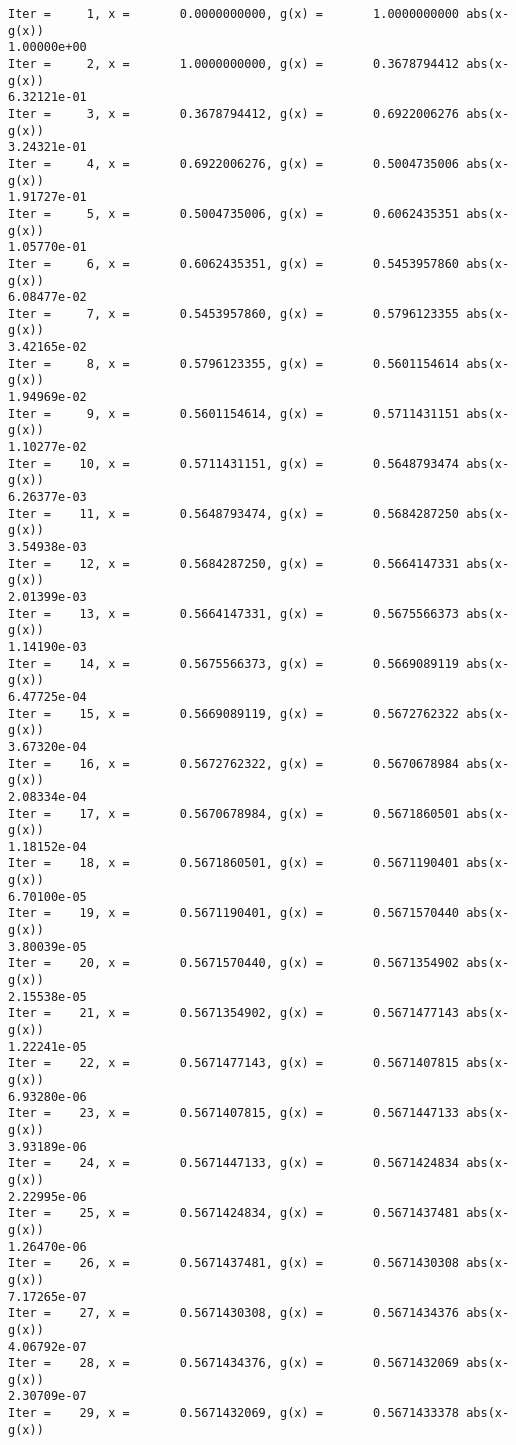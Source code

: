 \documentclass[11pt]{article}
\begin{document}
    \begin{Verbatim}[commandchars=\\\{\}]
Iter =     1, x =       0.0000000000, g(x) =       1.0000000000 abs(x-g(x))
1.00000e+00
Iter =     2, x =       1.0000000000, g(x) =       0.3678794412 abs(x-g(x))
6.32121e-01
Iter =     3, x =       0.3678794412, g(x) =       0.6922006276 abs(x-g(x))
3.24321e-01
Iter =     4, x =       0.6922006276, g(x) =       0.5004735006 abs(x-g(x))
1.91727e-01
Iter =     5, x =       0.5004735006, g(x) =       0.6062435351 abs(x-g(x))
1.05770e-01
Iter =     6, x =       0.6062435351, g(x) =       0.5453957860 abs(x-g(x))
6.08477e-02
Iter =     7, x =       0.5453957860, g(x) =       0.5796123355 abs(x-g(x))
3.42165e-02
Iter =     8, x =       0.5796123355, g(x) =       0.5601154614 abs(x-g(x))
1.94969e-02
Iter =     9, x =       0.5601154614, g(x) =       0.5711431151 abs(x-g(x))
1.10277e-02
Iter =    10, x =       0.5711431151, g(x) =       0.5648793474 abs(x-g(x))
6.26377e-03
Iter =    11, x =       0.5648793474, g(x) =       0.5684287250 abs(x-g(x))
3.54938e-03
Iter =    12, x =       0.5684287250, g(x) =       0.5664147331 abs(x-g(x))
2.01399e-03
Iter =    13, x =       0.5664147331, g(x) =       0.5675566373 abs(x-g(x))
1.14190e-03
Iter =    14, x =       0.5675566373, g(x) =       0.5669089119 abs(x-g(x))
6.47725e-04
Iter =    15, x =       0.5669089119, g(x) =       0.5672762322 abs(x-g(x))
3.67320e-04
Iter =    16, x =       0.5672762322, g(x) =       0.5670678984 abs(x-g(x))
2.08334e-04
Iter =    17, x =       0.5670678984, g(x) =       0.5671860501 abs(x-g(x))
1.18152e-04
Iter =    18, x =       0.5671860501, g(x) =       0.5671190401 abs(x-g(x))
6.70100e-05
Iter =    19, x =       0.5671190401, g(x) =       0.5671570440 abs(x-g(x))
3.80039e-05
Iter =    20, x =       0.5671570440, g(x) =       0.5671354902 abs(x-g(x))
2.15538e-05
Iter =    21, x =       0.5671354902, g(x) =       0.5671477143 abs(x-g(x))
1.22241e-05
Iter =    22, x =       0.5671477143, g(x) =       0.5671407815 abs(x-g(x))
6.93280e-06
Iter =    23, x =       0.5671407815, g(x) =       0.5671447133 abs(x-g(x))
3.93189e-06
Iter =    24, x =       0.5671447133, g(x) =       0.5671424834 abs(x-g(x))
2.22995e-06
Iter =    25, x =       0.5671424834, g(x) =       0.5671437481 abs(x-g(x))
1.26470e-06
Iter =    26, x =       0.5671437481, g(x) =       0.5671430308 abs(x-g(x))
7.17265e-07
Iter =    27, x =       0.5671430308, g(x) =       0.5671434376 abs(x-g(x))
4.06792e-07
Iter =    28, x =       0.5671434376, g(x) =       0.5671432069 abs(x-g(x))
2.30709e-07
Iter =    29, x =       0.5671432069, g(x) =       0.5671433378 abs(x-g(x))

\end{Verbatim}
\end{document}
